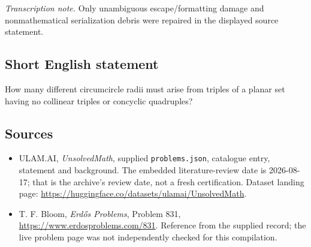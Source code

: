 \documentclass[11pt,a4paper]{article}
\begin{document}
{\small\emph{Transcription note.} Only unambiguous escape/formatting damage and nonmathematical serialization debris were repaired in the displayed source statement.}

\subsection{Short English statement}

How many different circumcircle radii must arise from triples of a planar set having no collinear triples or concyclic quadruples?

\subsection{Sources}

{\small

\begin{itemize}

\item[\hypertarget{source:statement:1}{S1}] ULAM.AI, \emph{UnsolvedMath}, supplied \texttt{problems.json}, catalogue entry, statement and background. The embedded literature-review date is 2026-08-17; that is the archive’s review date, not a fresh certification. Dataset landing page: \url{https://huggingface.co/datasets/ulamai/UnsolvedMath}.

\item[\hypertarget{source:statement:2}{S2}] T. F. Bloom, \emph{Erdős Problems}, Problem 831, \url{https://www.erdosproblems.com/831}. Reference from the supplied record; the live problem page was not independently checked for this compilation.

\end{itemize}

}

\label{end:statement}
\end{document}
